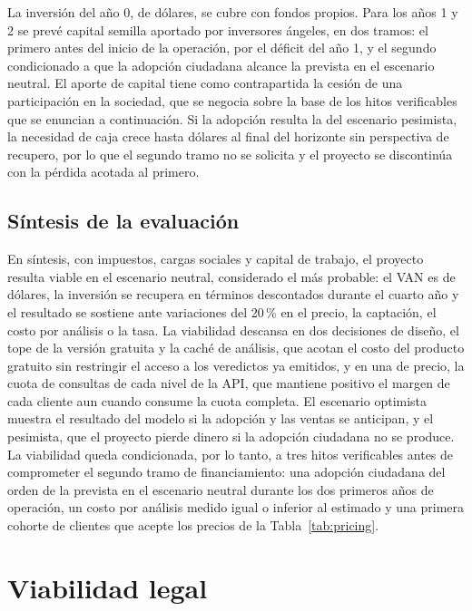 La inversión del año 0, de \finNeuInversion{} dólares, se cubre con fondos propios. Para los años 1 y 2 se prevé capital semilla aportado por inversores ángeles, en dos tramos: el primero antes del inicio de la operación, por el déficit del año 1, y el segundo condicionado a que la adopción ciudadana alcance la prevista en el escenario neutral. El aporte de capital tiene como contrapartida la cesión de una participación en la sociedad, que se negocia sobre la base de los hitos verificables que se enuncian a continuación. Si la adopción resulta la del escenario pesimista, la necesidad de caja crece hasta \finPesNecesidad{} dólares al final del horizonte sin perspectiva de recupero, por lo que el segundo tramo no se solicita y el proyecto se discontinúa con la pérdida acotada al primero.

\subsection{Síntesis de la evaluación}

En síntesis, con impuestos, cargas sociales y capital de trabajo, el proyecto resulta viable en el escenario neutral, considerado el más probable: el VAN es de \finNeuVan{} dólares, la inversión se recupera en términos descontados durante el cuarto año y el resultado se sostiene ante variaciones del 20\,\% en el precio, la captación, el costo por análisis o la tasa. La viabilidad descansa en dos decisiones de diseño, el tope de la versión gratuita y la caché de análisis, que acotan el costo del producto gratuito sin restringir el acceso a los veredictos ya emitidos, y en una de precio, la cuota de consultas de cada nivel de la API, que mantiene positivo el margen de cada cliente aun cuando consume la cuota completa. El escenario optimista muestra el resultado del modelo si la adopción y las ventas se anticipan, y el pesimista, que el proyecto pierde dinero si la adopción ciudadana no se produce. La viabilidad queda condicionada, por lo tanto, a tres hitos verificables antes de comprometer el segundo tramo de financiamiento: una adopción ciudadana del orden de la prevista en el escenario neutral durante los dos primeros años de operación, un costo por análisis medido igual o inferior al estimado y una primera cohorte de clientes que acepte los precios de la Tabla~\ref{tab:pricing}.

\section{Viabilidad legal}
\label{sec:legal}

